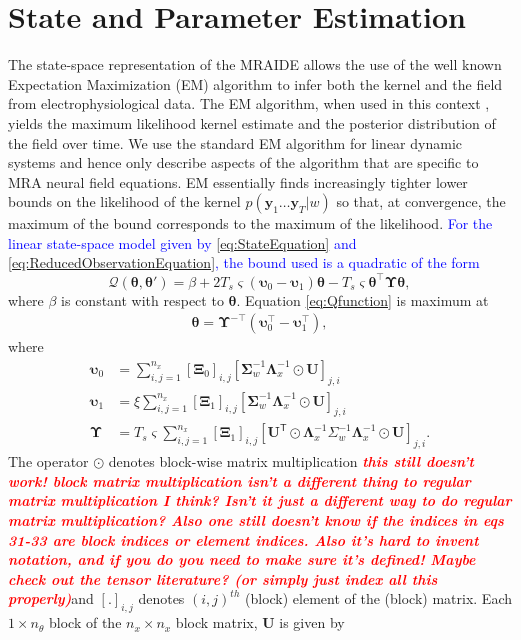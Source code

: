 \documentclass[journal]{IEEEtran}
\newcommand{\mike}[1]{\textsf{\emph{\textbf{\textcolor{red}{#1}}}}}
\newcommand{\parham}[1]{\textcolor{blue}{#1}}
\begin{document}
\section{State and Parameter Estimation}
The state-space representation of the MRAIDE allows the use of the well known Expectation Maximization (EM) algorithm \cite{Dempster1977} to infer both the kernel and the field from electrophysiological data. The EM algorithm, when used in this context \cite{Dewar2009}, yields the maximum likelihood kernel estimate and the posterior distribution of the field over time. We use the standard EM algorithm for linear dynamic systems \cite{Roweis1999,Shumway2000} and hence only describe aspects of the algorithm that are specific to MRA neural field equations. EM essentially finds increasingly tighter lower bounds on the likelihood of the kernel $p(\mathbf{y}_1 \ldots \mathbf{y}_T|w)$ so that, at convergence, the maximum of the bound corresponds to the maximum of the likelihood. \parham{For the linear state-space model given by \eqref{eq:StateEquation} and \eqref{eq:ReducedObservationEquation}, the bound used is a quadratic of the form}
\begin{equation}\label{eq:Qfunction}
 \mathcal Q\left(\boldsymbol \theta,\boldsymbol\theta'\right)=\beta+2T_s\varsigma\left(\boldsymbol\upsilon_0-\boldsymbol\upsilon_1\right)\boldsymbol\theta-T_s\varsigma\boldsymbol\theta^\top\boldsymbol\Upsilon\boldsymbol\theta,
\end{equation}
where $\beta$ is constant with respect to $\boldsymbol\theta$. Equation \eqref{eq:Qfunction} is maximum at
\begin{align}
 \boldsymbol \theta= \boldsymbol\Upsilon^{-\top}(\boldsymbol\upsilon_0^\top-\boldsymbol\upsilon_1^\top),
\end{align}
where
\begin{align}\label{eq:upsilon0}
 \boldsymbol\upsilon_0 & =\sum_{i,j=1}^{n_x}[\boldsymbol\Xi_0]_{i,j}[\boldsymbol\Sigma_{w}^{-1}\boldsymbol\Lambda_{x}^{-1}\odot\mathbf U]_{j,i}\\ 
 \boldsymbol\upsilon_1 & =\xi\sum_{i,j=1}^{n_x}[\boldsymbol\Xi_1]_{i,j}[\boldsymbol\Sigma_{w}^{-1}\boldsymbol\Lambda_{x}^{-1}\odot\mathbf U]_{j,i}\label{eq:upsilon1} \\
 \boldsymbol\Upsilon&=T_s\varsigma\sum_{i,j=1}^{n_x}[\boldsymbol\Xi_1]_{i,j}[\mathbf{U}^{\mathsf T}\odot \boldsymbol\Lambda_{x}^{-1}\Sigma_{w}^{-1}\boldsymbol\Lambda_{x}^{-1}\odot\mathbf{U}]_{j,i}\label{eq:Upsilon}.
\end{align}
The operator $\odot$ denotes block-wise matrix multiplication \mike{this still doesn't work! block matrix multiplication isn't a different thing to regular matrix multiplication I think? Isn't it just a different way to do regular matrix multiplication? Also one still doesn't know if the indices in eqs 31-33 are block indices or element indices. Also it's hard to invent notation, and if you do you need to make sure it's defined! Maybe check out the tensor literature? (or simply just index all this properly)}and  $[.]_{i,j}$ denotes $\left(i,j\right)^{th}$ (block) element of the (block) matrix. Each $1\times n_{\theta}$ block of the $n_x \times n_x$ block matrix,  $\mathbf U$ is given by
\end{document}
